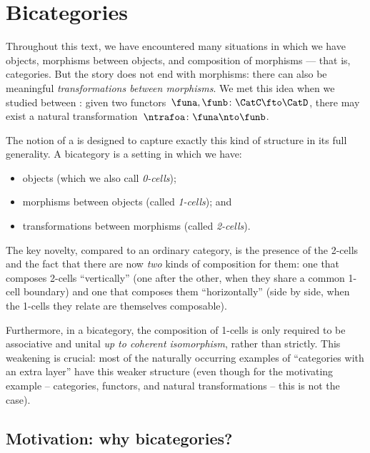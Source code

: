 
\section{Bicategories}
\label{sec:bicats-def}



Throughout this text, we have encountered many situations in which we have objects, morphisms between objects, and composition of morphisms --- that is, categories.
But the story does not end with morphisms: there can also be meaningful \emph{transformations between morphisms}.
We met this idea when we studied  between : given two functors~$\funa, \funb \colon \CatC \fto \CatD$, there may exist a natural transformation~$\ntrafoa \colon \funa \nto \funb$.


The notion of a  is designed to capture exactly this kind of structure in its full generality.
A bicategory is a setting in which we have:
\begin{itemize}
    \item objects (which we also call \emph{0-cells});
    \item morphisms between objects (called \emph{1-cells}); and
    \item transformations between morphisms (called \emph{2-cells}).
\end{itemize}

The key novelty, compared to an ordinary category, is the presence of the 2-cells and the fact that there are now \emph{two} kinds of composition for them: one that composes 2-cells ``vertically'' (one after the other, when they share a common 1-cell boundary) and one that composes them ``horizontally'' (side by side, when the 1-cells they relate are themselves composable).

Furthermore, in a bicategory, the composition of 1-cells is only required to be associative and unital \emph{up to coherent isomorphism}, rather than strictly. This weakening is crucial: most of the naturally occurring examples of ``categories with an extra layer'' have this weaker structure (even though for the motivating example -- categories, functors, and natural transformations -- this is not the case).

\subsection{Motivation: why bicategories?}

